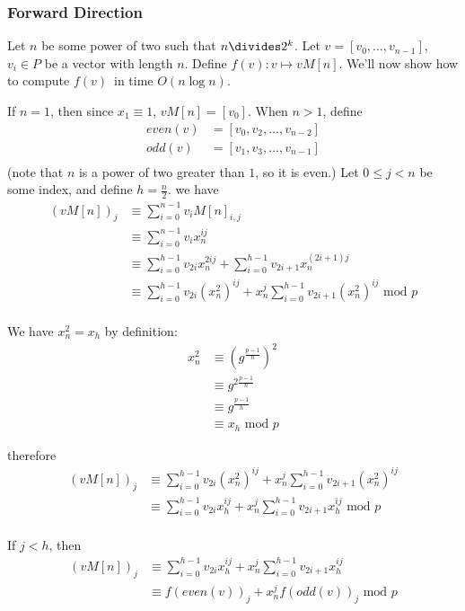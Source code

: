 \documentclass{article}
\begin{document}
\subsubsection{Forward Direction}

Let $n$ be some power of two such that $n \divides 2^{k}$. Let $v = [v_{0}, \dots, v_{n-1}]$, $v_{i} \in P$ be a vector with length $n$.
Define $f(v): v \mapsto vM[n]$. We'll now show how to compute $f(v)$ in time $O(n \log n)$.

If $n = 1$, then since $x_{1} \equiv 1$, $vM[n] = [v_{0}]$. When $n > 1$, define
\begin{align*}
even(v) &= [v_{0}, v_{2}, \dots, v_{n-2}]\\
odd(v) &= [v_{1}, v_{3}, \dots, v_{n-1}]\\
\end{align*}
(note that $n$ is a power of two greater than $1$, so it is even.) Let $0 \leq j < n$ be some index, and define $h = \frac{n}{2}$. we have
\begin{align*}
(vM[n])_{j}	&\equiv \sum_{i=0}^{n-1} v_{i} M[n]_{i, j}\\
		&\equiv \sum_{i=0}^{n-1} v_{i} x_{n}^{ij}\\
		&\equiv \sum_{i=0}^{h-1} v_{2i} x_{n}^{2ij} + \sum_{i=0}^{h-1} v_{2i+1} x_{n}^{(2i+1)j}\\
		&\equiv \sum_{i=0}^{h-1} v_{2i} \left(x_{n}^{2}\right)^{ij} + x_{n}^{j} \sum_{i=0}^{h-1} v_{2i+1} \left(x_{n}^{2}\right)^{ij} \text{ mod } p\\
\end{align*}

We have $x_{n}^{2} = x_{h}$ by definition:
\begin{align*}
x_{n}^{2}	&\equiv \left(g^{\frac{p-1}{n}}\right)^{2}\\
		&\equiv g^{2 \frac{p-1}{n}}\\
		&\equiv g^{\frac{p-1}{h}}\\
		&\equiv x_{h} \text{ mod } p
\end{align*}

therefore
\begin{align*}
(vM[n])_{j}	&\equiv \sum_{i=0}^{h-1} v_{2i} \left(x_{n}^{2}\right)^{ij} + x_{n}^{j} \sum_{i=0}^{h-1} v_{2i+1} \left(x_{n}^{2}\right)^{ij}\\
		&\equiv \sum_{i=0}^{h-1} v_{2i} x_{h}^{ij} + x_{n}^{j} \sum_{i=0}^{h-1} v_{2i+1} x_{h}^{ij} \text{ mod } p\\
\end{align*}

If $j < h$, then
\begin{align*}
(vM[n])_{j}	&\equiv \sum_{i=0}^{h-1} v_{2i} x_{h}^{ij} + x_{n}^{j} \sum_{i=0}^{h-1} v_{2i+1} x_{h}^{ij}\\
		&\equiv f(even(v))_{j} + x_{n}^{j} f(odd(v))_{j} \text{ mod } p\\
\end{align*}
\end{document}
